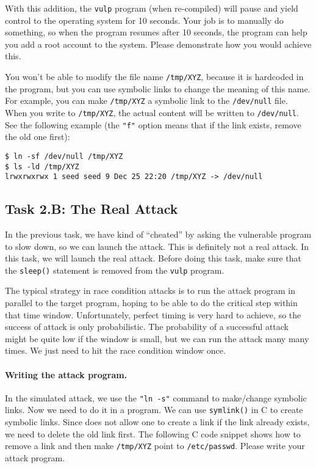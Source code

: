With this addition, the \texttt{vulp} program (when re-compiled)
will pause and yield control to the operating system for 10 seconds.
Your job is to manually do something, so when the program resumes
after 10 seconds, the program can help you
add a root account to the system. Please 
demonstrate how you would achieve this. 

You won't be able to modify the file name \texttt{/tmp/XYZ}, because 
it is hardcoded in the program, but you can use symbolic links to 
change the meaning of this name. For example, you can make 
\texttt{/tmp/XYZ} a symbolic link to the \texttt{/dev/null} file. 
When you write to \texttt{/tmp/XYZ}, the actual content will be written
to \texttt{/dev/null}. See the following example (the \texttt{"f"} option 
means that if the link exists, remove the old one first): 

\begin{lstlisting}
$ ln -sf /dev/null /tmp/XYZ
$ ls -ld /tmp/XYZ
lrwxrwxrwx 1 seed seed 9 Dec 25 22:20 /tmp/XYZ -> /dev/null
\end{lstlisting}
 
\subsection{Task 2.B: The Real Attack}

In the previous task, we have kind of ``cheated'' by asking the vulnerable program
to slow down, so we can launch the attack. This is definitely not a real attack.
In this task, we will launch the real attack. 
Before doing this task, make sure that the \texttt{sleep()} statement is removed 
from the \texttt{vulp} program. 


The typical strategy in race condition attacks is to run the attack
program in parallel to the target program, 
hoping to be able to do the critical step within that time window.
Unfortunately, perfect timing is very hard to achieve, so 
the success of attack is only probabilistic.
The probability of a successful attack might be quite low if the window
is small, but we can run the attack many many times. 
We just need to hit the race condition window once.  


\paragraph{Writing the attack program.} In the simulated attack,
we use the \texttt{"ln -s"} command to make/change symbolic links.
Now we need to do it in a program.
We can use {\tt symlink()} in C to create symbolic links.
Since \linux does not allow one to create a link if the link already exists,
we need to delete the old link first.
The following C code snippet shows how to remove a link and then make
{\tt /tmp/XYZ} point to {\tt /etc/passwd}. Please write your attack 
program.

